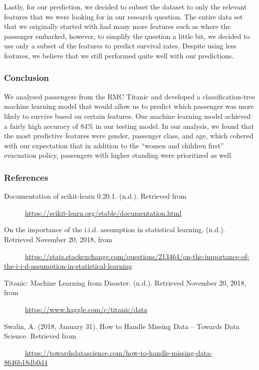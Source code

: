 \documentclass[]{article}
\begin{document}
Lastly, for our prediction, we decided to subset the dataset to only the
relevant features that we were looking for in our research question. The
entire data set that we originally started with had many more features
such as where the passenger embarked, however, to simplify the question
a little bit, we decided to use only a subset of the features to predict
survival rates. Despite using less features, we believe that we still
performed quite well with our predictions.

\subsubsection{Conclusion}\label{conclusion}

We analysed passengers from the RMC Titanic and developed a
classification-tree machine learning model that would allow us to
predict which passenger was more likely to survive based on certain
features. Our machine learning model achieved a fairly high accuracy of
84\% in our testing model. In our analysis, we found that the most
predictive features were gender, passenger class, and age, which cohered
with our expectation that in addition to the ``women and children
first'' evacuation policy, passengers with higher standing were
prioritized as well.

\newpage

\subsubsection{References}\label{references}

Documentation of scikit-learn 0.20.1. (n.d.). Retrieved from

~~~~~~\url{https://scikit-learn.org/stable/documentation.html}

On the importance of the i.i.d. assumption in statistical learning.
(n.d.). Retrieved November 20, 2018, from

~~~~~~\url{https://stats.stackexchange.com/questions/213464/on-the-importance-of-the-i-i-d-assumption-in-statistical-learning}

Titanic: Machine Learning from Disaster. (n.d.). Retrieved November 20,
2018, from

~~~~~~\url{https://www.kaggle.com/c/titanic/data}

Swalin, A. (2018, January 31). How to Handle Missing Data -- Towards
Data Science. Retrieved from

~~~~~~\url{https://towardsdatascience.com/how-to-handle-missing-data-8646b18db0d4}
\end{document}
